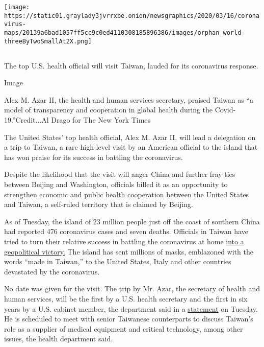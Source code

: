 \texttt{[image: https://static01.graylady3jvrrxbe.onion/newsgraphics/2020/03/16/coronavirus-maps/20139a6bad1057ff5cc9c0ed4110308185896386/images/orphan\_world-threeByTwoSmallAt2X.png]}

\hypertarget{-3}{%
\subsection{}\label{-3}}

The top U.S. health official will visit Taiwan, lauded for its
coronavirus response.

Image

Alex M. Azar II, the health and human services secretary, praised Taiwan
as ``a model of transparency and cooperation in global health during the
Covid-19.''Credit...Al Drago for The New York Times

The United States' top health official, Alex M. Azar II, will lead a
delegation on a trip to Taiwan, a rare high-level visit by an American
official to the island that has won praise for its success in battling
the coronavirus.

Despite the likelihood that the visit will anger China and further fray
ties between Beijing and Washington, officials billed it as an
opportunity to strengthen economic and public health cooperation between
the United States and Taiwan, a self-ruled territory that is claimed by
Beijing.

As of Tuesday, the island of 23 million people just off the coast of
southern China had reported 476 coronavirus cases and seven deaths.
Officials in Taiwan have tried to turn their relative success in
battling the coronavirus at home
\href{https://www.nytimes3xbfgragh.onion/2020/04/22/world/asia/coronavirus-china-taiwan.html?searchResultPosition=4}{into
a geopolitical victory.} The island has sent millions of masks,
emblazoned with the words ``made in Taiwan,'' to the United States,
Italy and other countries devastated by the coronavirus.

No date was given for the visit. The trip by Mr. Azar, the secretary of
health and human services, will be the first by a U.S. health secretary
and the first in six years by a U.S. cabinet member, the department said
in a
\href{https://www.hhs.gov/about/news/2020/08/04/hhs-secretary-alex-azar-lead-delegation-taiwan-in-first-visit-by-us-hhs-secretary.html}{statement}
on Tuesday. He is scheduled to meet with senior Taiwanese counterparts
to discuss Taiwan's role as a supplier of medical equipment and critical
technology, among other issues, the health department said.

